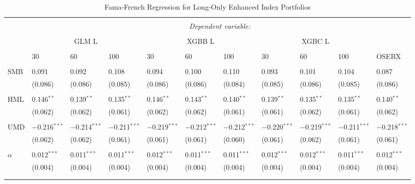 \begin{table}[H] 
  \caption{Fama-French Regression for Long-Only Enhanced Index Portfolios} 
  \label{table:FAMA-FRENCH-LONG-ONLY-ENHANCED-FINAL} 
\begin{tabularx}{\textwidth}{XXXXXXXXXXl} 
\\[-1.8ex]\hline 
\hline \\[-1.8ex] 
 & \multicolumn{10}{c}{\textit{Dependent variable:}} \\ 
\cline{2-11} 
\\[-1.8ex] 
& \multicolumn{3}{c}{GLM L} & \multicolumn{3}{c}{XGBB L} & \multicolumn{3}{c}{XGBC L} & \\
\cline{2-11}
\\[-1.8ex] 
& 30 & 60 & 100 & 30 & 60 & 100 & 30 & 60 & 100 & OSEBX \\ 
\cline{2-11} \\
 SMB & 0.091 & 0.092 & 0.108 & 0.094 & 0.100 & 0.110 & 0.093 & 0.101 & 0.104 & 0.087 \\ 
  & (0.086) & (0.086) & (0.085) & (0.086) & (0.086) & (0.084) & (0.085) & (0.086) & (0.085) & (0.086) \\ 
  & & & & & & & & & & \\ 
 HML & 0.146$^{**}$ & 0.139$^{**}$ & 0.135$^{**}$ & 0.146$^{**}$ & 0.143$^{**}$ & 0.140$^{**}$ & 0.139$^{**}$ & 0.135$^{**}$ & 0.135$^{**}$ & 0.140$^{**}$ \\ 
  & (0.062) & (0.062) & (0.061) & (0.062) & (0.062) & (0.061) & (0.061) & (0.062) & (0.061) & (0.062) \\ 
  & & & & & & & & & & \\ 
 UMD & $-$0.216$^{***}$ & $-$0.214$^{***}$ & $-$0.211$^{***}$ & $-$0.219$^{***}$ & $-$0.212$^{***}$ & $-$0.212$^{***}$ & $-$0.220$^{***}$ & $-$0.219$^{***}$ & $-$0.211$^{***}$ & $-$0.218$^{***}$ \\ 
  & (0.062) & (0.062) & (0.061) & (0.061) & (0.061) & (0.060) & (0.061) & (0.062) & (0.061) & (0.061) \\ 
  & & & & & & & & & & \\ 
 $\alpha$ & 0.012$^{***}$ & 0.011$^{***}$ & 0.011$^{***}$ & 0.012$^{***}$ & 0.011$^{***}$ & 0.011$^{***}$ & 0.012$^{***}$ & 0.012$^{***}$ & 0.011$^{***}$ & 0.012$^{***}$ \\ 
  & (0.004) & (0.004) & (0.004) & (0.004) & (0.004) & (0.004) & (0.004) & (0.004) & (0.004) & (0.004) \\ 
  & & & & & & & & & & \\ 
\hline \\[-1.8ex] 

\end{tabularx}
\end{table}
